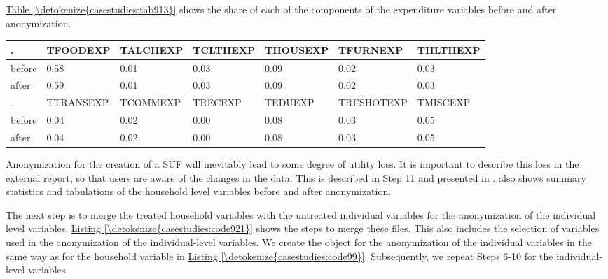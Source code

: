 \documentclass[letterpaper,10pt,english]{sphinxmanual}
\begin{document}
\hyperref[\detokenize{casestudies:tab913}]{Table \ref{\detokenize{casestudies:tab913}}} shows the share of each of the components of the expenditure
variables before and after anonymization.


\begin{savenotes}\sphinxattablestart
\centering
{}
\label{\detokenize{casestudies:tab913}}\label{\detokenize{casestudies:id34}}
\sphinxaftercaption
\begin{tabulary}{\linewidth}[t]{|T|T|T|T|T|T|T|}
\hline
\sphinxstyletheadfamily 
.
&\sphinxstyletheadfamily 
TFOODEXP
&\sphinxstyletheadfamily 
TALCHEXP
&\sphinxstyletheadfamily 
TCLTHEXP
&\sphinxstyletheadfamily 
THOUSEXP
&\sphinxstyletheadfamily 
TFURNEXP
&\sphinxstyletheadfamily 
THLTHEXP
\\
\hline
before
&
0.58
&
0.01
&
0.03
&
0.09
&
0.02
&
0.03
\\
\hline
after
&
0.59
&
0.01
&
0.03
&
0.09
&
0.02
&
0.03
\\
\hline
.
&
TTRANSEXP
&
TCOMMEXP
&
TRECEXP
&
TEDUEXP
&
TRESHOTEXP
&
TMISCEXP
\\
\hline
before
&
0.04
&
0.02
&
0.00
&
0.08
&
0.03
&
0.05
\\
\hline
after
&
0.04
&
0.02
&
0.00
&
0.08
&
0.03
&
0.05
\\
\hline
\end{tabulary}
\par
\sphinxattableend\end{savenotes}

Anonymization for the creation of a SUF will inevitably lead to some
degree of utility loss. It is important to describe this loss in the
external report, so that users are aware of the changes in the data.
This is described in Step 11 and presented in
.
also shows summary statistics and tabulations of the household level
variables before and after anonymization.


The next step is to merge the treated household variables with the
untreated individual variables for the anonymization of the individual
level variables. \hyperref[\detokenize{casestudies:code921}]{Listing \ref{\detokenize{casestudies:code921}}} shows the steps to merge these files. This
also includes the selection of variables used in the anonymization of
the individual-level variables. We create the  object for the
anonymization of the individual variables in the same way as for the
household variable in \hyperref[\detokenize{casestudies:code99}]{Listing \ref{\detokenize{casestudies:code99}}}. Subsequently, we repeat Steps 6-10
for the individual-level variables.
\end{document}
